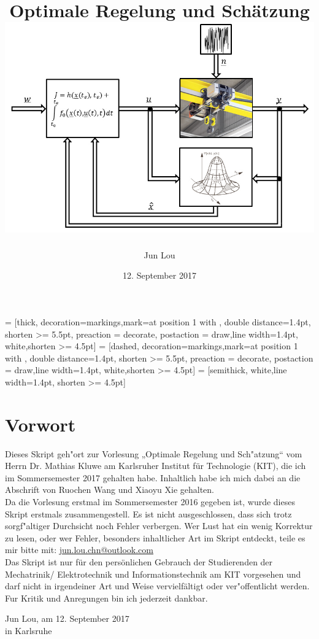 \documentclass[openany,a4paper,11pt]{book}
\author{Jun Lou}
\date{12. September 2017}
\title{\Huge \textbf{Optimale Regelung und Schätzung} \\[2cm] \protect \includegraphics[width=\textwidth]{ors.png}}
\begin{document}

 = [thick, decoration={markings,mark=at position
1 with {}},
double distance=1.4pt, shorten >= 5.5pt,
preaction = {decorate},
postaction = {draw,line width=1.4pt, white,shorten >= 4.5pt}]
 = [dashed, decoration={markings,mark=at position
1 with {}},
double distance=1.4pt, shorten >= 5.5pt,
preaction = {decorate},
postaction = {draw,line width=1.4pt, white,shorten >= 4.5pt}]  
 = [semithick, white,line width=1.4pt, shorten >= 4.5pt]


\newcommand\encircle[1]{%
\tikz[baseline=(X.base)] \node (X) [draw, shape=circle, inner sep=0] {\strut #1};}

\pagestyle{plain}
\maketitle
\tableofcontents
\setcounter{page}{1}
\frontmatter
{}
\chapter*{Vorwort}   
Dieses Skript geh"ort zur Vorlesung „Optimale Regelung und Sch"atzung“ vom Herrn Dr. Mathias Kluwe am Karlsruher Institut für Technologie (KIT), die ich im Sommersemester 2017 gehalten habe. Inhaltlich habe ich mich dabei an die Abschrift von Ruochen Wang und Xiaoyu Xie gehalten. \\[5pt]
Da die Vorlesung erstmal im Sommersemester 2016 gegeben ist, wurde dieses Skript erstmals zusammengestell. Es ist nicht
ausgeschlossen, dass sich trotz sorgf"altiger Durchsicht noch Fehler verbergen. Wer Lust hat ein wenig Korrektur zu lesen, oder wer Fehler, besonders inhaltlicher Art im Skript entdeckt, teile es mir bitte mit: {\color{blue}\href{mailto:jun.lou.chn@outlook.com}{jun.lou.chn@outlook.com}}\\[5pt]
Das Skript ist nur für den persönlichen Gebrauch der Studierenden der Mechatrinik/ Elektrotechnik und Informationstechnik am KIT vorgesehen und darf nicht in irgendeiner Art und Weise vervielfältigt oder ver"offentlicht werden. \\[5pt]
Fur Kritik und Anregungen bin ich jederzeit dankbar.\\[6pt]
\begin{flushright} Jun Lou, am 12. September 2017\\
in Karlsruhe\end{flushright}
\setcounter{page}{1}
\mainmatter
\end{document}
